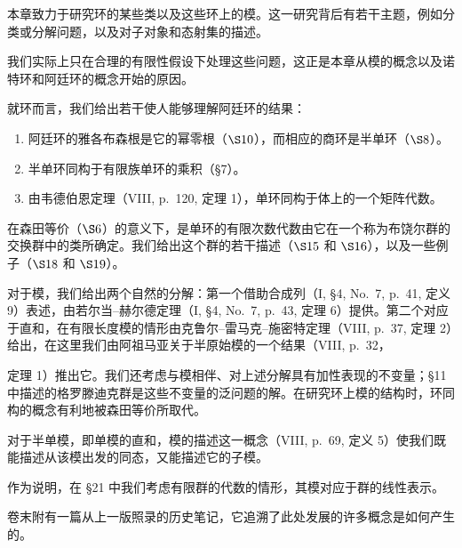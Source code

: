 
本章致力于研究环的某些类以及这些环上的模。这一研究背后有若干主题，例如分类或分解问题，以及对子对象和态射集的描述。

我们实际上只在合理的有限性假设下处理这些问题，这正是本章从模的概念以及诺特环和阿廷环的概念开始的原因。

就环而言，我们给出若干使人能够理解阿廷环的结果：

\begin{enumerate}
\def\labelenumi{\alph{enumi})}
\item
  阿廷环的雅各布森根是它的幂零根（\(\S10\)），而相应的商环是半单环（\(\S8\)）。
\item
  半单环同构于有限族单环的乘积（§7）。
\item
  由韦德伯恩定理（VIII, p.~120, 定理 1），单环同构于体上的一个矩阵代数。
\end{enumerate}

在森田等价（\(\S6\)）的意义下，是单环的有限次数代数由它在一个称为布饶尔群的交换群中的类所确定。我们给出这个群的若干描述（\(\S15\) 和 \(\S16\)），以及一些例子（\(\S18\) 和 \(\S19\)）。

对于模，我们给出两个自然的分解：第一个借助合成列（I, §4, No.~7, p.~41, 定义 9）表述，由若尔当--赫尔德定理（I, §4, No.~7, p.~43, 定理 6）提供。第二个对应于直和，在有限长度模的情形由克鲁尔--雷马克--施密特定理（VIII, p.~37, 定理 2）给出，在这里我们由阿祖马亚关于半原始模的一个结果（VIII, p.~32，

定理 1）推出它。我们还考虑与模相伴、对上述分解具有加性表现的不变量；§11 中描述的格罗滕迪克群是这些不变量的泛问题的解。在研究环上模的结构时，环同构的概念有利地被森田等价所取代。

对于半单模，即单模的直和，模的描述这一概念（VIII, p.~69, 定义 5）使我们既能描述从该模出发的同态，又能描述它的子模。

作为说明，在 §21 中我们考虑有限群的代数的情形，其模对应于群的线性表示。

卷末附有一篇从上一版照录的历史笔记，它追溯了此处发展的许多概念是如何产生的。

\BourbakiMainMatter
\setcounter{chapter}{7}
